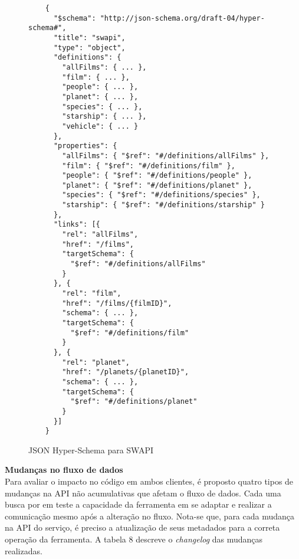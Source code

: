 \begin{figure}[H]
  \centering
  \begin{verbatim}
    {
      "$schema": "http://json-schema.org/draft-04/hyper-schema#",
      "title": "swapi",
      "type": "object",
      "definitions": {
        "allFilms": { ... },
        "film": { ... },
        "people": { ... },
        "planet": { ... },
        "species": { ... },
        "starship": { ... },
        "vehicle": { ... }
      },
      "properties": {
        "allFilms": { "$ref": "#/definitions/allFilms" },
        "film": { "$ref": "#/definitions/film" },
        "people": { "$ref": "#/definitions/people" },
        "planet": { "$ref": "#/definitions/planet" },
        "species": { "$ref": "#/definitions/species" },
        "starship": { "$ref": "#/definitions/starship" }
      },
      "links": [{
        "rel": "allFilms",
        "href": "/films",
        "targetSchema": {
          "$ref": "#/definitions/allFilms"
        }
      }, {
        "rel": "film",
        "href": "/films/{filmID}",
        "schema": { ... },
        "targetSchema": {
          "$ref": "#/definitions/film"
        }
      }, {
        "rel": "planet",
        "href": "/planets/{planetID}",
        "schema": { ... },
        "targetSchema": {
          "$ref": "#/definitions/planet"
        }
      }]
    }
  \end{verbatim}
  \caption{JSON Hyper-Schema para SWAPI}
\end{figure}

\textbf{Mudanças no fluxo de dados} \\

Para avaliar o impacto no código em ambos clientes, é proposto quatro tipos de mudanças na API não acumulativas que afetam o fluxo de dados. Cada uma busca por em teste a capacidade da ferramenta em se adaptar e realizar a comunicação mesmo após a alteração no fluxo. Nota-se que, para cada mudança na API do serviço, é preciso a atualização de seus metadados para a correta operação da ferramenta. A tabela 8 descreve o \textit{changelog} das mudanças realizadas.

